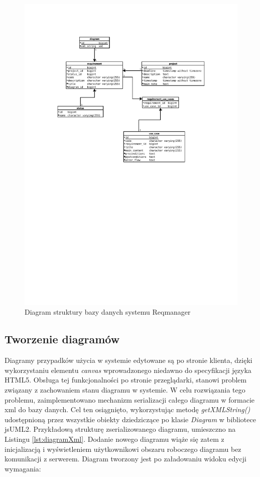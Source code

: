     
    \begin{figure}[t]
      \centering
      \includegraphics[width=1.0\textwidth]{img/erd.pdf}
      \caption{Diagram struktury bazy danych systemu Reqmanager}
      \label{fig:erd1}
    \end{figure}

    \subsection{Tworzenie diagramów}

      Diagramy przypadków użycia w systemie edytowane są po stronie klienta, dzięki wykorzystaniu elementu \emph{canvas} wprowadzonego niedawno do specyfikacji języka HTML5. Obsługa tej funkcjonalności po stronie przeglądarki, stanowi problem związany z zachowaniem stanu diagramu w systemie. W celu rozwiązania tego problemu, zaimplementowano mechanizm serializacji całego diagramu w formacie xml do bazy danych. Cel ten osiągnięto, wykorzystując metodę \emph{getXMLString()} udostępnioną przez wszystkie obiekty dziedziczące po klasie \emph{Diagram} w bibliotece jsUML2. Przykładową strukturę zserializowanego diagramu, umieszczno na Listingu \ref{lst:diagramXml}. 
      Dodanie nowego diagramu wiąże się zatem z inicjalizacją i wyświetleniem użytkownikowi obszaru roboczego diagramu bez komunikacji z serwerem. Diagram tworzony jest po załadowaniu widoku edycji wymagania:

